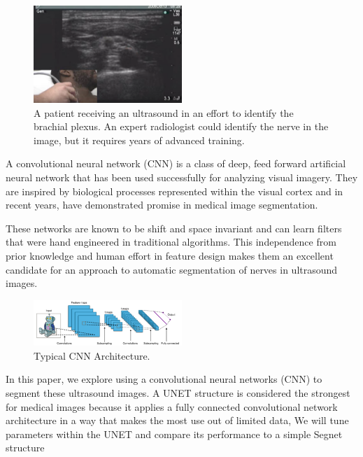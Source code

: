 \documentclass[letterpaper]{article}
\begin{document}
 \begin{figure}[H]
  \centerline{\includegraphics[width=0.5\textwidth]{Images/UltrasoundNerve.png}}
  \caption{A patient receiving an ultrasound in an effort to identify the brachial plexus. An expert radiologist could identify the nerve in the image, but it requires years of advanced training.}
  \label{fig:cnnarchitecture}
\end{figure}

A convolutional neural network (CNN) is a class of deep, feed forward artificial neural network that has been used successfully for analyzing visual imagery. They are inspired by biological processes represented within the visual cortex and in recent years, have demonstrated promise in medical image segmentation. 

These networks are known to be shift and space invariant and can learn filters that were hand engineered in traditional algorithms. This independence from prior knowledge and human effort in feature design makes them an excellent candidate for an approach to automatic segmentation of nerves in ultrasound images. 



 \begin{figure}[H]
  \centerline{\includegraphics[width=0.5\textwidth]{Images/TypicalCNN.png}}
  \caption{Typical CNN Architecture.}
  \label{fig:cnnarchitecture}
\end{figure}

In this paper, we explore using a convolutional neural networks (CNN) to segment these ultrasound images. A UNET structure is considered the strongest for medical images because it applies a fully connected convolutional network architecture in a way that makes the most use out of limited data, We will tune parameters within the UNET and compare its  performance to a simple Segnet structure 
\end{document}
